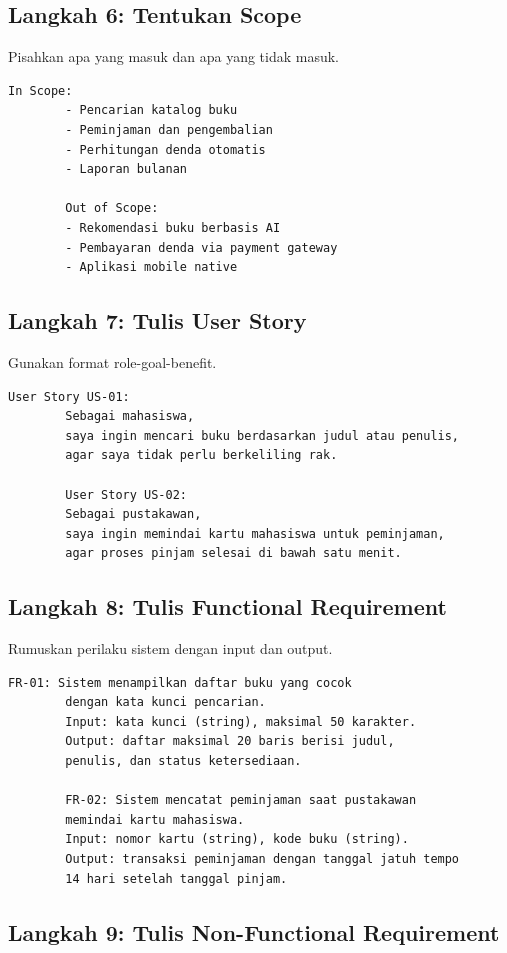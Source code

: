\documentclass[11pt,a4paper]{article}
\begin{document}
\subsection{Langkah 6: Tentukan Scope}

Pisahkan apa yang masuk dan apa yang tidak masuk.

\begin{lstlisting}[style=out]
		In Scope:
		- Pencarian katalog buku
		- Peminjaman dan pengembalian
		- Perhitungan denda otomatis
		- Laporan bulanan

		Out of Scope:
		- Rekomendasi buku berbasis AI
		- Pembayaran denda via payment gateway
		- Aplikasi mobile native
	\end{lstlisting}

\subsection{Langkah 7: Tulis User Story}

Gunakan format role-goal-benefit.

\begin{lstlisting}[style=out]
		User Story US-01:
		Sebagai mahasiswa,
		saya ingin mencari buku berdasarkan judul atau penulis,
		agar saya tidak perlu berkeliling rak.

		User Story US-02:
		Sebagai pustakawan,
		saya ingin memindai kartu mahasiswa untuk peminjaman,
		agar proses pinjam selesai di bawah satu menit.
	\end{lstlisting}

\subsection{Langkah 8: Tulis Functional Requirement}

Rumuskan perilaku sistem dengan input dan output.

\begin{lstlisting}[style=out]
		FR-01: Sistem menampilkan daftar buku yang cocok
		dengan kata kunci pencarian.
		Input: kata kunci (string), maksimal 50 karakter.
		Output: daftar maksimal 20 baris berisi judul,
		penulis, dan status ketersediaan.

		FR-02: Sistem mencatat peminjaman saat pustakawan
		memindai kartu mahasiswa.
		Input: nomor kartu (string), kode buku (string).
		Output: transaksi peminjaman dengan tanggal jatuh tempo
		14 hari setelah tanggal pinjam.
	\end{lstlisting}

\subsection{Langkah 9: Tulis Non-Functional Requirement}
\end{document}
